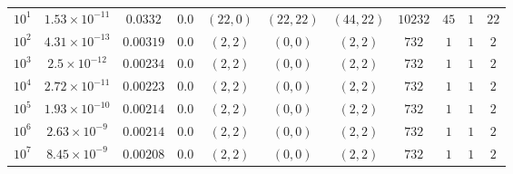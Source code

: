 \begin{tabular}{l c c c c c c c c c c}
$10^1$  &  $1.53 \times 10^{-11}$  &  $0.0332$  &  $0.0$  &  $(22, 0)$  &  $(22, 22)$  &  $(44, 22)$  &  $10232$  &  $45$  &  $1$  &  $22$\\ 
$10^2$  &  $4.31 \times 10^{-13}$  &  $0.00319$  &  $0.0$  &  $(2, 2)$  &  $(0, 0)$  &  $(2, 2)$  &  $732$  &  $1$  &  $1$  &  $2$\\ 
$10^3$  &  $2.5 \times 10^{-12}$  &  $0.00234$  &  $0.0$  &  $(2, 2)$  &  $(0, 0)$  &  $(2, 2)$  &  $732$  &  $1$  &  $1$  &  $2$\\ 
$10^4$  &  $2.72 \times 10^{-11}$  &  $0.00223$  &  $0.0$  &  $(2, 2)$  &  $(0, 0)$  &  $(2, 2)$  &  $732$  &  $1$  &  $1$  &  $2$\\ 
$10^5$  &  $1.93 \times 10^{-10}$  &  $0.00214$  &  $0.0$  &  $(2, 2)$  &  $(0, 0)$  &  $(2, 2)$  &  $732$  &  $1$  &  $1$  &  $2$\\ 
$10^6$  &  $2.63 \times 10^{-9}$  &  $0.00214$  &  $0.0$  &  $(2, 2)$  &  $(0, 0)$  &  $(2, 2)$  &  $732$  &  $1$  &  $1$  &  $2$\\ 
$10^7$  &  $8.45 \times 10^{-9}$  &  $0.00208$  &  $0.0$  &  $(2, 2)$  &  $(0, 0)$  &  $(2, 2)$  &  $732$  &  $1$  &  $1$  &  $2$\\ 

\end{tabular}
